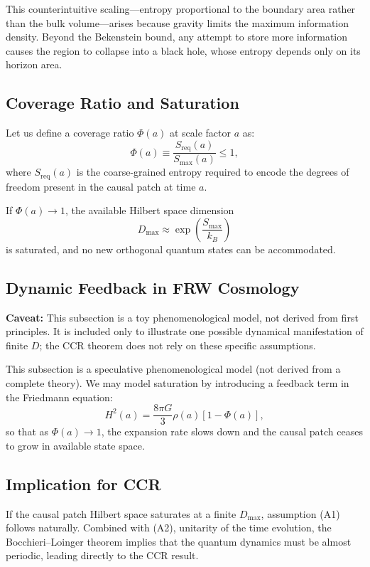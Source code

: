 \documentclass[12pt]{article}
\newcommand{\Smax}{S_{\max}}
\theoremstyle{remark}
\begin{document}
This counterintuitive scaling---entropy proportional to the boundary area rather than the bulk volume---arises because gravity 
limits the maximum information density. Beyond the Bekenstein bound, any attempt to store more information causes the region 
to collapse into a black hole, whose entropy depends only on its horizon area.


\subsection{Coverage Ratio and Saturation}
Let us define a coverage ratio \(\Phi(a)\) at scale factor \(a\) as:
\begin{equation}
\Phi(a) \equiv \frac{S_{\text{req}}(a)}{\Smax(a)} \le 1,
\end{equation}
where \(S_{\text{req}}(a)\) is the coarse-grained entropy required to encode the degrees of freedom present in the causal patch at time \(a\).

If \(\Phi(a) \to 1\), the available Hilbert space dimension
\begin{equation}
D_{\max} \approx \exp\left( \frac{\Smax}{k_B} \right)
\end{equation}
is saturated, and no new orthogonal quantum states can be accommodated.

\subsection{Dynamic Feedback in FRW Cosmology}
\textbf{Caveat:} This subsection is a toy phenomenological model, not derived from first principles. 
It is included only to illustrate one possible dynamical manifestation of finite $D$; 
the CCR theorem does not rely on these specific assumptions.

This subsection is a speculative phenomenological model (not derived from a complete theory). We may model saturation by introducing a feedback term in the Friedmann equation:
\begin{equation}
H^2(a) = \frac{8\pi G}{3} \rho(a) \left[1 - \Phi(a)\right],
\end{equation}
so that as \(\Phi(a) \to 1\), the expansion rate slows down and the causal patch ceases to grow in available state space.

\subsection{Implication for CCR}
If the causal patch Hilbert space saturates at a finite \(D_{\max}\), assumption (A1) follows naturally. Combined with (A2), unitarity of the time evolution, the Bocchieri--Loinger theorem implies that the quantum dynamics must be almost periodic, leading directly to the CCR result.
\end{document}
